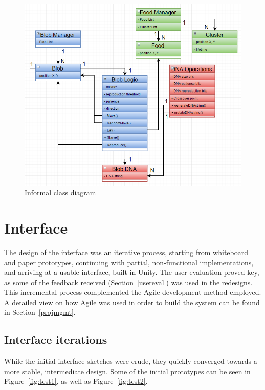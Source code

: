 \begin{figure}[!th]
	\centering
	\includegraphics[scale=0.5]{images/mmodel}
	\caption{\label{fig:mmodel}Informal class diagram}
\end{figure}

\section{Interface}

The design of the interface was an iterative process, starting from whiteboard and paper prototypes, continuing with partial, non-functional implementations, and arriving at a usable interface, built in Unity. The user evaluation proved key, as some of the feedback received (Section~\ref{usereval}) was used in the redesigns. This incremental process complemented the Agile development method employed. A detailed view on how Agile was used in order to build the system can be found in Section~\ref{projmgmt}. 

\subsection{Interface iterations}
While the initial interface sketches were crude, they quickly converged towards a more stable, intermediate design. Some of the initial prototypes can be seen in Figure~\ref{fig:test1}, as well as Figure~\ref{fig:test2}.

